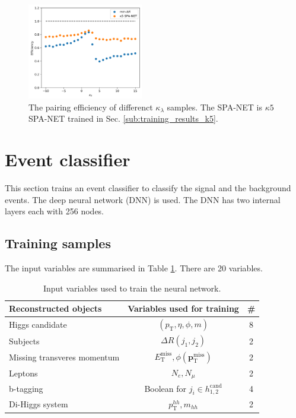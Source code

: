 \documentclass[12pt]{article}
\renewcommand{\vec}[1]{\boldsymbol{\mathbf{#1}}}
\begin{document}
	\begin{figure}[htpb]
		\centering
		\includegraphics[width=0.45\textwidth]{pairing_efficiency_kappa-k5.png}
		\caption{The pairing efficiency of differenct $\kappa_\lambda $ samples. The SPA-NET is $\kappa 5 $ SPA-NET trained in Sec. \ref{sub:training_results_k5}.}
		\label{fig:pairing_efficiency_kappa-k5}
	\end{figure}
\section{Event classifier}%
\label{sec:event_classifier}
	This section trains an event classifier to classify the signal and the background events. The deep neural network (DNN) is used.  The DNN has two internal layers each with 256 nodes.

	\subsection{Training samples}%
	\label{sub:training_samples}
		The input variables are summarised in Table \ref{tab:DNN_variables}. There are 20 variables.
		\begin{table}[htpb]
			\centering
			\caption{Input variables used to train the neural network.}
			\label{tab:DNN_variables}
			\begin{tabular}{l|c|c}
				Reconstructed objects       & Variables used for training   & \# \\ \hline
				Higgs candidate             & $(p_\text{T}, \eta, \phi, m)$ & 8  \\
				Subjects                    & $\Delta R(j_1,j_2)$                    & 2  \\
				Missing transveres momentum & $E_{\text{T}}^{\text{miss}}, \phi(\vec{p}_{\text{T}}^{\text{miss}})$  & 2  \\
				Leptons                     & $N_e, N_\mu $                  & 2  \\
				b-tagging                   & Boolean for $j_i \in h_{1,2}^{\text{cand}}$       & 4  \\
				Di-Higgs system             & $p_\text{T}^{hh}, m_{hh}$        & 2 
			\end{tabular}		
		\end{table}
\end{document}
